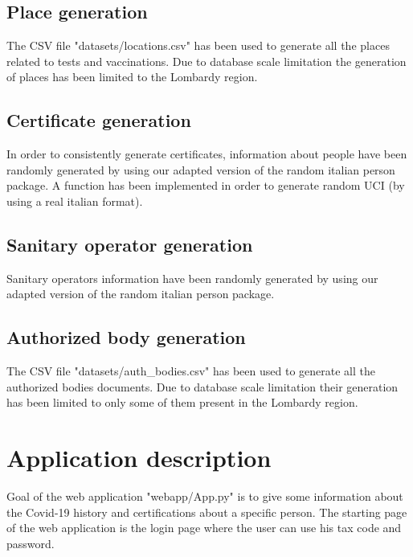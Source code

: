 \documentclass{article}
\begin{document}
\subsection{Place generation}
The CSV file {\selectfont"datasets/locations.csv"} has been used to generate all the places related to tests and vaccinations. Due to database scale limitation the generation of places has been limited to the Lombardy region.

\subsection{Certificate generation}
In order to consistently generate certificates, information about people have been randomly generated by using our adapted version of the random italian person package. A function has been implemented in order to generate random UCI (by using a real italian format).

\subsection{Sanitary operator generation}
Sanitary operators information have been randomly generated by using our adapted version of the random italian person package.

\subsection{Authorized body generation}
The CSV file {\selectfont"datasets/auth\_bodies.csv"} has been used to generate all the authorized bodies documents. Due to database scale limitation their generation has been limited to only some of them present in the Lombardy region.


\newpage
\section{Application description}
Goal of the web application {\selectfont"webapp/App.py"} is to give some information about the Covid-19 history and certifications about a specific person.
The starting page of the web application is the login page where the user can use his tax code
and password.
\end{document}
